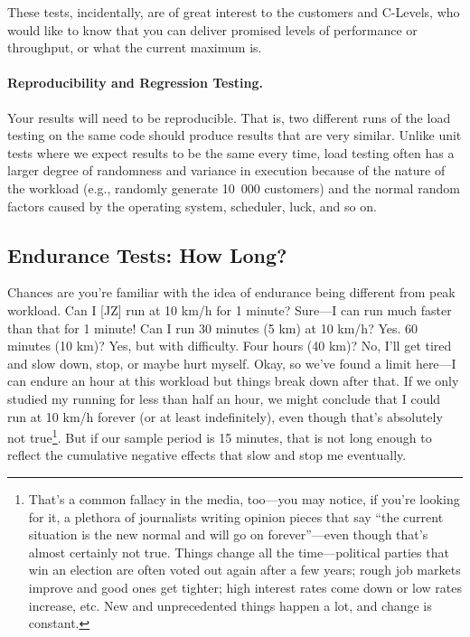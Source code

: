 These tests, incidentally, are of great interest to the customers and C-Levels, who would like to know that you can deliver promised levels of performance or throughput, or what the current maximum is.

\paragraph{Reproducibility and Regression Testing.}
Your results will need to be reproducible. That is, two different runs of the load testing on the same code should produce results that are very similar. Unlike unit tests where we expect results to be the same every time, load testing often has a larger degree of randomness and variance in execution because of the nature of the workload (e.g., randomly generate 10~000 customers) and the normal random factors caused by the operating system, scheduler, luck, and so on. 


\subsection*{Endurance Tests: How Long?}
Chances are you're familiar with the idea of endurance being different from peak workload. Can I [JZ] run at 10 km/h for 1 minute? Sure---I can run much faster than that for 1 minute! Can I run 30 minutes (5 km) at 10 km/h? Yes. 60 minutes (10 km)? Yes, but with difficulty. Four hours (40 km)? No, I'll get tired and slow down, stop, or maybe hurt myself. Okay, so we've found a limit here---I can endure an hour at this workload but things break down after that. If we only studied my running for less than half an hour, we might conclude that I could run at 10 km/h forever (or at least indefinitely), even though that's absolutely not true\footnote{That's a common fallacy in the media, too---you may notice, if you're looking for it, a plethora of journalists writing opinion pieces that say ``the current situation is the new normal and will go on forever''---even though that's almost certainly not true. Things change all the time---political parties that win an election are often voted out again after a few years; rough job markets improve and good ones get tighter; high interest rates come down or low rates increase, etc. New and unprecedented things happen a lot, and change is constant.}. But if our sample period is 15 minutes, that is not long enough to reflect the cumulative negative effects that slow and stop me eventually. 

